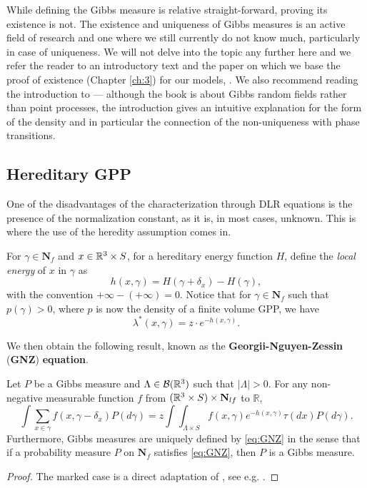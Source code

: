 While defining the Gibbs measure is relative straight-forward, proving its existence is not. The existence and uniqueness of Gibbs measures is an active field of research and one where we still currently do not know much, particularly in case of uniqueness.  We will not delve into the topic any further here and we refer the reader to an introductory text \cite{Dereudre2017} and the paper on which we base the proof of existence (Chapter \ref{ch:3}) for our models, \cite{DDG12}. We also recommend reading the introduction to \cite{Georgii2011} --- although the book is about Gibbs random fields rather than point processes, the introduction gives an intuitive explanation for the form of the density and in particular the connection of the non-uniqueness with phase transitions.

\subsection{Hereditary GPP}
One of the disadvantages of the characterization through DLR equations is the presence of the normalization constant, as it is, in most cases, unknown. This is where the use of the heredity assumption comes in.

For $\gamma \in \mathbf N_f$ and $x \in {\mathbb R^3}\times S$, for a hereditary energy function $H$, define the \textit{local energy} of $x$ in $\gamma$ as
$$h(x,\gamma) = H(\gamma + \delta_x) - H(\gamma),$$
with the convention $+\infty - (+\infty) = 0$. Notice that for $\gamma \in \mathbf N_f$ such that $p(\gamma) > 0$, where $p$ is now the density of a finite volume GPP, we have
$$\lambda^*(x,\gamma) = z \cdot e^{-h(x,\gamma)}.$$

We then obtain the following result, known as the \textbf{Georgii-Nguyen-Zessin }(\textbf{GNZ}) \textbf{equation}. 

\begin{proposition} Let $P$ be a Gibbs measure and $\Lambda \in \mathcal B({\mathbb R^3})$ such that $|\Lambda|>0$. For any non-negative measurable function $f$ from $({\mathbb R^3}\times S)\times \mathbf N_{lf}$ to $\mathbb R$,
	\begin{equation}\label{eq:GNZ}\int \sum_{x \in \gamma} f(x,\gamma- \delta_x) P(d\gamma) = z \int \int_{\Lambda\times S} f(x,\gamma) e^{-h(x,\gamma)} \tau(dx) P (d\gamma).\end{equation}
	Furthermore, Gibbs measures are uniquely defined by \eqref{eq:GNZ} in the sense that if a probability measure $P$ on $\mathbf N_f$ satisfies \eqref{eq:GNZ}, then $P$ is a Gibbs measure.
\end{proposition}
\begin{proof}
	The marked case is a direct adaptation of \cite{NguyenZessin1979}, see e.g. \cite{Mase2000}.		
\end{proof}

